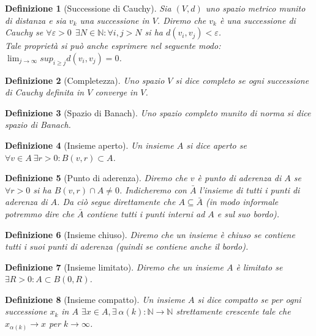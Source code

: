 \documentclass[a4paper,12pt]{report}
\newtheorem{definizione}{Definizione}[chapter]
\begin{document}
\begin{definizione}[Successione di Cauchy]\label{def: 1.38}
    Sia $(V,d)$ uno spazio metrico munito di distanza e sia $v_k$ una successione in $V$. Diremo che $v_k$ è una successione di Cauchy se $\forall \varepsilon>0\ \  \exists N \in\mathbb{N}:\forall i,j>N $ si ha $d(v_i,v_j)<\varepsilon$.
    \\ Tale proprietà si può anche esprimere nel seguente modo: $\displaystyle\lim_{j \to \infty}sup_{i \ge j}d(v_i,v_j)=0$.
\end{definizione}

\begin{definizione}[Completezza]\label{def: 1.40}
    Uno spazio $V$ si dice completo se ogni successione di Cauchy definita in $V$ converge in $V$.
\end{definizione}

\begin{definizione}[Spazio di Banach]\label{def: 1.41}
    Uno spazio completo munito di norma si dice spazio di Banach.
\end{definizione}

\begin{definizione}[Insieme aperto]
    Un insieme $A$ si dice aperto se $\forall v\in A \ \exists r>0: B(v,r) \subset A$.
\end{definizione}

\begin{definizione}[Punto di aderenza]
    Diremo che $v$ è punto di aderenza di $A$ se $\forall r>0$ si ha $B(v,r)\cap A \neq 0$. Indicheremo con $\bar{A}$ l'insieme di tutti i punti di aderenza di $A$. Da ciò segue direttamente che $A\subseteq\bar{A}$ (in modo informale potremmo dire che $\bar{A}$ contiene tutti i punti interni ad $A$ e sul suo bordo).
\end{definizione}

\begin{definizione}[Insieme chiuso]\label{def: 1.44}
    Diremo che un insieme è chiuso se contiene tutti i suoi punti di aderenza (quindi se contiene anche il bordo).
\end{definizione}

\begin{definizione}[Insieme limitato]
    Diremo che un insieme $A$ è limitato se $\exists R >0:A\subset B(0,R)$.
\end{definizione}

\begin{definizione}[Insieme compatto]\label{def: 1.46}
    Un insieme $A$ si dice compatto se per ogni successione $x_k$ in $A$ $\exists x \in A, \exists \  \alpha(k):\mathbb{N}\to \mathbb{N}$ strettamente crescente tale che $x_{\alpha (k)} \to x$ per $k \to \infty$.
\end{definizione}
\end{document}
